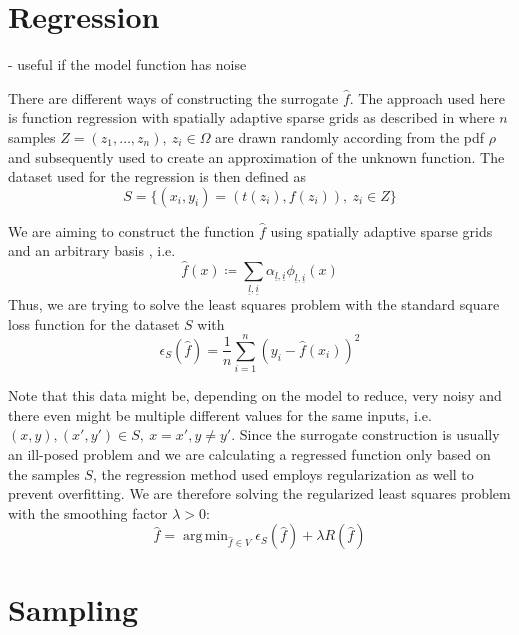 \documentclass[
  a4paper,  %
  twoside,  %
  bibliography=totoc,
  headsepline,
  cleardoublepage=empty,
  parskip=half,
  draft=false
]{scrbook}
\DeclareMathOperator*{\argmin}{arg\,min}
\begin{document}
\newpage

\section{Regression}

- useful if the model function has noise

There are different ways of constructing the surrogate $\hat{f}$.
The approach used here is function regression with spatially adaptive sparse grids as described in \cite{P10} where $n$ samples $Z=(z_1,\dots,z_n), ~ z_i \in \Omega$ are drawn randomly according from the pdf $\rho$ and subsequently used to create an approximation of the unknown function.
The dataset used for the regression is then defined as
\begin{equation}
S=\{(x_i,y_i) = (t(z_i),f(z_i)), ~ z_i \in Z\}
\end{equation}

We are aiming to construct the function $\hat{f}$ using spatially adaptive sparse grids and an arbitrary basis , i.e.
\begin{equation}
\hat{f}(x) \coloneqq \sum_{\underline{l},\underline{i}} \alpha_{\underline{l},\underline{i}} \phi_{\underline{l},\underline{i}}(x)
\end{equation}
Thus, we are trying to solve the least squares problem with the standard square loss function for the dataset $S$ with
\begin{equation}
\epsilon_{S}(\hat{f})=\frac{1}{n} \sum_{i=1}^n (y_i - \hat{f}(x_i))^2 
\end{equation}

Note that this data might be, depending on the model to reduce, very noisy and there even might be multiple different values for the same inputs, i.e. $(x,y), (x',y') \in S, ~ x=x', y\neq y'$.
Since the surrogate construction is usually an ill-posed problem and we are calculating a regressed function only based on the samples $S$, the regression method used employs regularization as well to prevent overfitting.
We are therefore solving the regularized least squares problem with the smoothing factor $\lambda > 0$:
\begin{equation}
\hat{f} = \argmin_{\hat{f} \in V} \epsilon_{S}(\hat{f}) + \lambda R(\hat{f})
\end{equation}

\newpage

\section{Sampling}
\end{document}
